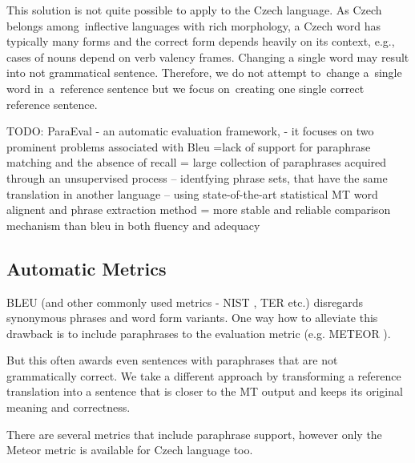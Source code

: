 \documentclass[11pt]{article}
\begin{document}
%
%

This solution is not quite possible to apply to the Czech language. As Czech belongs 
among~inflective languages with rich morphology, a Czech word has typically many forms 
and the correct form depends heavily on its context, e.g., cases of nouns depend on verb 
valency frames. Changing a single word may result into not grammatical sentence. Therefore, 
we do not attempt to~change a~single word in~a~reference sentence but we focus on~creating 
one single correct reference sentence.

TODO:
\cite{Zhou:2006}
ParaEval - an automatic evaluation framework, 
- it focuses on two prominent problems associated with Bleu =lack of support for paraphrase
matching and the absence of recall
= large  collection of paraphrases acquired through an unsupervised process -- identfying
phrase sets, that have the same translation in another language -- using state-of-the-art
statistical MT word alignent and phrase extraction method
= more stable and reliable comparison mechanism than bleu in both fluency and adequacy



\subsection{Automatic Metrics}
BLEU (and other commonly used metrics - NIST \cite{nist}, TER \cite{ter} etc.) 
disregards synonymous phrases and word form variants. One way how to  alleviate this 
drawback is to include paraphrases to the evaluation metric (e.g. METEOR \cite{meteor}). 

But this often awards even sentences with paraphrases that are not grammatically correct. 
We take a different approach by transforming a reference translation into a sentence that 
is closer to the MT output and keeps its original meaning and correctness.

There are several metrics that include paraphrase support, however only the Meteor metric
is available for Czech language too.%
\end{document}
